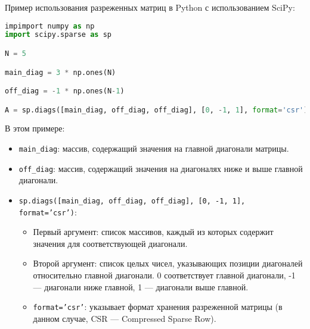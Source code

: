 \documentclass{report}
\begin{document}
Пример использования разреженных матриц в Python с использованием SciPy:

\begin{lstlisting}[language=Python]
impimport numpy as np
import scipy.sparse as sp

N = 5

main_diag = 3 * np.ones(N)

off_diag = -1 * np.ones(N-1)

A = sp.diags([main_diag, off_diag, off_diag], [0, -1, 1], format='csr')

\end{lstlisting}

В этом примере: 
\begin{itemize}
    \item \texttt{main\_diag}: массив, содержащий значения на главной диагонали матрицы.
    \item \texttt{off\_diag}: массив, содержащий значения на диагоналях ниже и выше главной диагонали.
    \item \texttt{sp.diags([main\_diag, off\_diag, off\_diag], [0, -1, 1], format='csr')}:
    \begin{itemize}
        \item Первый аргумент: список массивов, каждый из которых содержит значения для соответствующей диагонали.
        \item Второй аргумент: список целых чисел, указывающих позиции диагоналей относительно главной диагонали. 0 соответствует главной диагонали, -1 — диагонали ниже главной, 1 — диагонали выше главной.
        \item \texttt{format='csr'}: указывает формат хранения разреженной матрицы (в данном случае, CSR — Compressed Sparse Row).
    \end{itemize}
\end{itemize}
\end{document}
